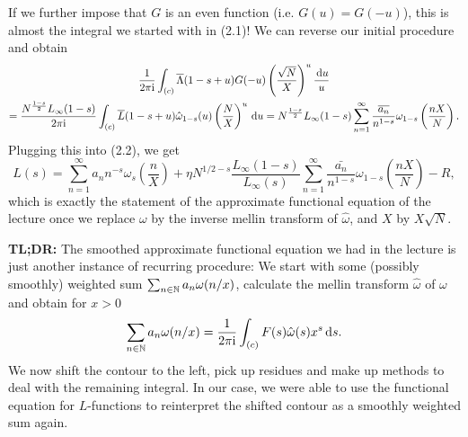 \documentclass[a4paper,11pt]{article}
\begin{document}
If we further impose that $G$ is an even function (i.e. $G(u) = G(-u)$), this is
almost the integral we started with in (2.1)! We can reverse our initial procedure
and obtain
\begin{multline*}
    \frac{1}{2 \pi \mathrm i} \int_{(c)} \overline \Lambda(1-s+u) G(-u) \left( \frac {\sqrt N}X \right)^u \frac {\mathrm{\,d} u} u \\ = \frac{N^{\frac{1-s}2}L_\infty(1-s)}{2 \pi \mathrm i} \int_{(c)}
    \overline L(1-s+u) \hat \omega_{1-s}(u) \left( \frac NX \right)^u \mathrm{\,d} u
    = N^{\frac{1-s}2} L_\infty(1-s) \sum_{n=1}^\infty \frac{\overline{a_n}}{n^{1-s}}
    \omega_{1-s}\left(\frac{nX}N\right).
\end{multline*}
Plugging this into (2.2), we get 
\[
    L(s) = \sum_{n=1}^\infty a_n n^{-s} \omega_s\left(\frac nX\right) + \eta N^{1/2 - s} \frac{L_\infty(1-s)}{L_\infty(s)} \sum_{n=1}^\infty \frac{\bar{a_n}}{n^{1-s}}
    \omega_{1-s}\left(\frac{nX}N\right) - R,
\]
which is exactly the statement of the approximate functional equation of the lecture
once we replace $\omega$ by the inverse mellin transform of $\hat \omega$, 
and $X$ by $X\sqrt N$. 

\textbf{TL;DR:} The smoothed approximate functional equation we had in the lecture
is just another instance of recurring procedure: 
We start with some (possibly smoothly) weighted sum $\sum_{n \in \mathbb{N}} a_n
\omega(n/x)$, calculate the mellin transform $\hat \omega$ of $\omega$ and obtain
for $x > 0$ 
$$ \sum_{n \in \mathbb{N}} a_n \omega(n/x) =\frac{1}{2 \pi \mathrm i} \int_{(c)} F(s) \hat \omega(s) x^s
\mathrm{\,d} s. $$
We now shift the contour to the left, pick up residues and make up methods to
deal with the remaining integral. In our case, we were able to use the 
functional equation for $L$-functions to reinterpret the shifted contour as 
a smoothly weighted sum again.



\end{document}
